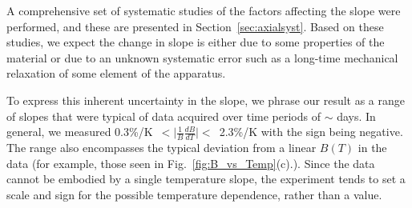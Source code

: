 A comprehensive set of systematic studies of the factors affecting the
slope were performed, and these are presented in
Section~\ref{sec:axialsyst}.  Based on these studies, we expect the
change in slope is either due to some properties of the material or
due to an unknown systematic error such as a long-time mechanical
relaxation of some element of the apparatus.

To express this inherent uncertainty in the slope, we phrase our
result as a range of slopes that were typical of data acquired over
time periods of $\sim$ days.  In general, we measured
0.3\%/K~$<\vert\frac{1}{B}\frac{dB}{dT}\vert<$~2.3\%/K with the sign
being negative.  The range also encompasses the typical deviation from
a linear $B(T)$ in the data (for example, those seen in
Fig.~\ref{fig:B_vs_Temp}(c).).  Since the data cannot be embodied by a
single temperature slope, the experiment tends to set a scale and sign
for the possible temperature dependence, rather than a value.

